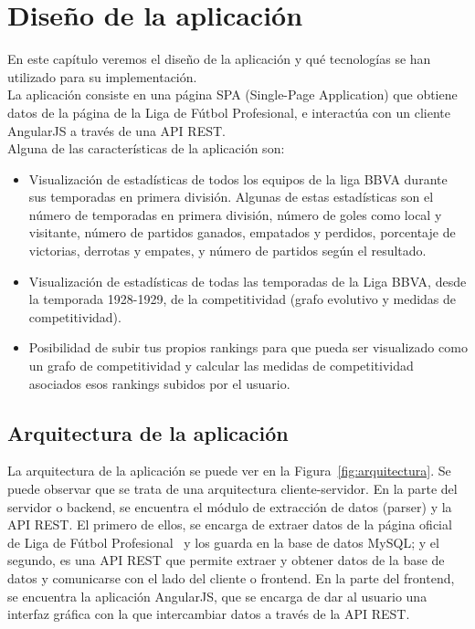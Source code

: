 \chapter{Diseño de la aplicación}

En este capítulo veremos el diseño de la aplicación y qué tecnologías se han utilizado para su implementación.\\

La aplicación consiste en una página SPA (Single-Page Application) que obtiene datos de la página de la Liga de Fútbol Profesional, e interactúa con un cliente AngularJS a través de una API REST.\\

Alguna de las características de la aplicación son:

\begin{itemize}
\item Visualización de estadísticas de todos los equipos de la liga BBVA durante sus temporadas en primera división. Algunas de estas estadísticas son el número de temporadas en primera división, número de goles como local y visitante, número de partidos ganados, empatados y perdidos, porcentaje de victorias, derrotas y empates, y número de partidos según el resultado.

\item Visualización de estadísticas de todas las temporadas de la Liga BBVA, desde la temporada 1928-1929, de la competitividad (grafo evolutivo y medidas de competitividad).

\item Posibilidad de subir tus propios rankings para que pueda ser visualizado como un grafo de competitividad y calcular las medidas de competitividad asociados esos rankings subidos por el usuario.   
\end{itemize}

\section{Arquitectura de la aplicación}

La arquitectura de la aplicación se puede ver en la Figura~\ref{fig:arquitectura}. Se puede observar que se trata de una arquitectura cliente-servidor. En la parte del servidor o backend, se encuentra el módulo de extracción de datos (parser) y la API REST. El primero de ellos, se encarga de extraer datos de la página oficial de Liga de Fútbol Profesional~\cite{lfp} y los guarda en la base de datos MySQL; y el segundo, es una API REST que permite extraer y obtener datos de la base de datos y comunicarse con el lado del cliente o frontend. En la parte del frontend, se encuentra la aplicación AngularJS, que se encarga de dar al usuario una interfaz gráfica con la que intercambiar datos a través de la API REST.  

